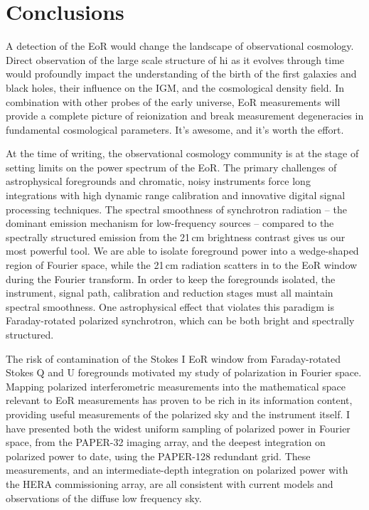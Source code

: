 \chapter{Conclusions}
\label{chapter:conc}
{\sloppy
A detection of the EoR would change the landscape of observational cosmology. Direct observation of the large scale structure of {\sc hi} as it evolves through time would profoundly impact the understanding of the birth of the first galaxies and black holes, their influence on the IGM, and the cosmological density field. In combination with other probes of the early universe, EoR measurements will provide a complete picture of reionization and break measurement degeneracies in fundamental cosmological parameters. It's awesome, and it's worth the effort.

At the time of writing, the observational cosmology community is at the stage of setting limits on the power spectrum of the EoR. The primary challenges of astrophysical foregrounds and chromatic, noisy instruments force long integrations with high dynamic range calibration and innovative digital signal processing techniques. The spectral smoothness of synchrotron radiation -- the dominant emission mechanism for low-frequency sources -- compared to the spectrally structured emission from the 21\,cm brightness contrast gives us our most powerful tool. We are able to isolate foreground power into a wedge-shaped region of Fourier space, while the 21\,cm radiation scatters in to the EoR window during the Fourier transform. In order to keep the foregrounds isolated, the instrument, signal path, calibration and reduction stages must all maintain spectral smoothness. One astrophysical effect that violates this paradigm is Faraday-rotated polarized synchrotron, which can be both bright and spectrally structured.

The risk of contamination of the Stokes I EoR window from Faraday-rotated Stokes Q and U foregrounds motivated my study of polarization in Fourier space. Mapping polarized interferometric measurements into the mathematical space relevant to EoR measurements has proven to be rich in its information content, providing useful measurements of the polarized sky and the instrument itself. I have presented both the widest uniform sampling of polarized power in Fourier space, from the PAPER-32 imaging array, and the deepest integration on polarized power to date, using the PAPER-128 redundant grid. These measurements, and an intermediate-depth integration on polarized power with the HERA commissioning array, are all consistent with current models and observations of the diffuse low frequency sky. 

}
